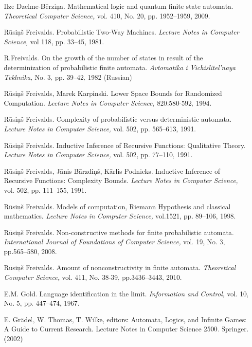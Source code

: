 \documentclass{llncs}
\begin{document}
\begin{thebibliography}{99}
Ilze Dzelme-B\= erzi\c na.
Mathematical logic and quantum finite state automata. 
{\em Theoretical Computer Science,} vol. 410, No. 20, pp. 1952--1959, 2009.  

 
R\= usi\c n\v s Freivalds.
Probabilistic Two-Way Machines.
{\em Lecture Notes in Computer Science,} vol 118, pp. 33--45, 1981. 

R.Freivalds.
On the growth of the number of states in result of the determinization of probabilistic finite automata.
\textit{Avtomatika i Vichislitel'naya Tekhnika}, No. 3, pp. 39--42, 1982 (Russian)


R\= usi\c n\v s Freivalds, Marek Karpinski. 
Lower Space Bounds for Randomized Computation. 
{\em Lecture Notes in Computer Science,} 820:580-592, 1994. 



R\= usi\c n\v s Freivalds.
Complexity of probabilistic versus deterministic automata. 
{\em Lecture Notes in Computer Science,} vol. 502, pp. 565--613, 1991.


R\= usi\c n\v s Freivalds.
Inductive Inference of Recursive Functions: Qualitative Theory.
{\em Lecture Notes in Computer Science,} vol. 502, pp. 77--110, 1991.

R\= usi\c n\v s Freivalds, J\= anis B\= arzdi\c n\v s, K\= arlis Podnieks. 
Inductive Inference of Recursive Functions: Complexity Bounds.
{\em Lecture Notes in Computer Science,} vol. 502, pp. 111--155, 1991.


R\= usi\c n\v s Freivalds.
Models of computation, Riemann Hypothesis and classical mathematics.
{\em Lecture Notes in Computer Science,} vol.1521, pp. 89--106, 1998.

R\= usi\c n\v s Freivalds.
Non-constructive methods for finite probabilistic automata.
{\em International Journal of Foundations of Computer Science,} vol. 19, No. 3, pp.565--580, 2008.

R\= usi\c n\v s Freivalds.
Amount of nonconstructivity in finite automata. 
{\em Theoretical Computer Science,} vol. 411, No. 38-39, pp.3436--3443, 2010.

E.M. Gold.
Language identification in the limit.
{\em Information and Control,} vol. 10, No. 5, pp. 447--474, 1967.

E. Gr\"adel, W. Thomas, T. Wilke, editors: 
Automata, Logics, and Infinite Games: A Guide to Current Research.
Lecture Notes in Computer Science 2500. Springer. (2002)
%



\end{thebibliography}
\end{document}
